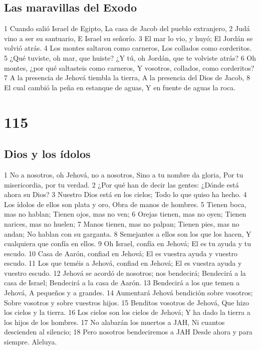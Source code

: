 \section*{Las maravillas del Exodo}

1 Cuando salió Israel de Egipto,
La casa de Jacob del pueblo extranjero,
2 Judá vino a ser su santuario,
E Israel su señorío.
3 El mar lo vio, y huyó;
El Jordán se volvió atrás.
4 Los montes saltaron como carneros,
Los collados como corderitos.
5 ¿Qué tuviste, oh mar, que huiste?
¿Y tú, oh Jordán, que te volviste atrás?
6 Oh montes, ¿por qué saltasteis como carneros,
Y vosotros, collados, como corderitos?
7 A la presencia de Jehová tiembla la tierra,
A la presencia del Dios de Jacob,
8 El cual cambió la peña en estanque de aguas,
Y en fuente de aguas la roca.

\chapter{115}

\section*{Dios y los ídolos}

1 No a nosotros, oh Jehová, no a nosotros,
Sino a tu nombre da gloria,
Por tu misericordia, por tu verdad.
2 ¿Por qué han de decir las gentes:
¿Dónde está ahora su Dios?
3 Nuestro Dios está en los cielos;
Todo lo que quiso ha hecho.
4 Los ídolos de ellos son plata y oro,
Obra de manos de hombres.
5 Tienen boca, mas no hablan;
Tienen ojos, mas no ven;
6 Orejas tienen, mas no oyen;
Tienen narices, mas no huelen;
7 Manos tienen, mas no palpan;
Tienen pies, mas no andan;
No hablan con su garganta.
8 Semejantes a ellos son los que los hacen,
Y cualquiera que confía en ellos.
9 Oh Israel, confía en Jehová;
El es tu ayuda y tu escudo.
10 Casa de Aarón, confiad en Jehová;
El es vuestra ayuda y vuestro escudo.
11 Los que teméis a Jehová, confiad en Jehová;
El es vuestra ayuda y vuestro escudo.
12 Jehová se acordó de nosotros; nos bendecirá;
Bendecirá a la casa de Israel;
Bendecirá a la casa de Aarón.
13 Bendecirá a los que temen a Jehová,
A pequeños y a grandes.
14 Aumentará Jehová bendición sobre vosotros;
Sobre vosotros y sobre vuestros hijos.
15 Benditos vosotros de Jehová,
Que hizo los cielos y la tierra.
16 Los cielos son los cielos de Jehová;
Y ha dado la tierra a los hijos de los hombres.
17 No alabarán los muertos a JAH,
Ni cuantos descienden al silencio;
18 Pero nosotros bendeciremos a JAH
Desde ahora y para siempre.
Aleluya.

